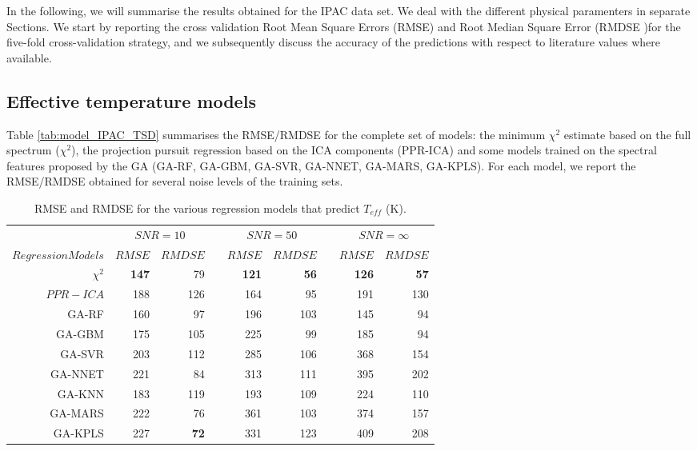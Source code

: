 
In the following, we will summarise the results obtained for the IPAC
data set. We deal with the different physical paramenters in separate
Sections. We start by reporting the cross validation Root Mean Square
Errors (RMSE) and Root Median Square Error (RMDSE )for the five-fold
cross-validation strategy, and we subsequently discuss the accuracy of
the predictions with respect to literature values where available.

\subsection{Effective temperature models}

Table \ref{tab:model_IPAC_TSD} summarises the RMSE/RMDSE for the
complete set of models: the minimum $\chi^2$ estimate based on the
full spectrum ($\chi^2$), the projection pursuit regression based on
the ICA components (PPR-ICA) and some models trained on the spectral
features proposed by the GA (GA-RF, GA-GBM, GA-SVR, GA-NNET, GA-MARS,
GA-KPLS). For each model, we report the RMSE/RMDSE obtained for
several noise levels of the training sets.

\begin{table}\centering
{}
\begin{tabular}{@{}rrrcrrcrr@{}}\toprule
& \multicolumn{2}{c}{$SNR = 10$} & \phantom{ab}& \multicolumn{2}{c}{$SNR = 50$} &
\phantom{ab} & \multicolumn{2}{c}{$SNR = \infty$}\\
\cmidrule{2-3} \cmidrule{5-6} \cmidrule{8-9}
$Regression Models$ & $RMSE$ & $RMDSE$ && $RMSE$ & $RMDSE$ && $RMSE$ & $RMDSE$ \\ \midrule
$\chi^2$    & {\bf 147} & 79       && {\bf 121} & {\bf 56}  && {\bf 126} & {\bf 57} \\
$ PPR-ICA$  & 188       & 126      && 164       & 95        && 191       & 130 \\
GA-RF       & 160       & 97       && 196       & 103       && 145       & 94 \\
GA-GBM      & 175       & 105      && 225       & 99        && 185       & 94 \\
GA-SVR      & 203       & 112      && 285       & 106       && 368       & 154 \\
GA-NNET     & 221       & 84       && 313       & 111       && 395       & 202 \\
GA-KNN      & 183       & 119      && 193       & 109       && 224       & 110  \\
GA-MARS     & 222       & 76       && 361       & 103       && 374       & 157 \\
GA-KPLS     & 227       & {\bf 72} && 331       & 123       && 409       & 208 \\
\bottomrule
\end{tabular}
\caption {RMSE and RMDSE for the various regression models that predict $T_{eff}$ (K).} 
\label{tab:model_TSD} 
\end{table}

